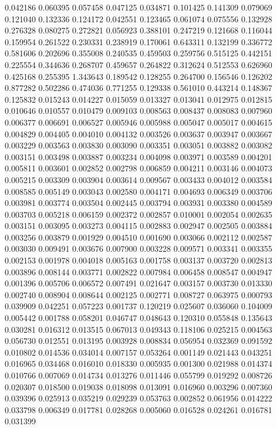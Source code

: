 0.042186
0.060395
0.057458
0.047125
0.034871
0.101425
0.141309
0.079069
0.121040
0.132336
0.124172
0.042551
0.123465
0.061074
0.075556
0.132928
0.276328
0.080275
0.272821
0.056923
0.388101
0.247219
0.121668
0.116044
0.159954
0.261522
0.230331
0.238919
0.170061
0.643311
0.132199
0.336772
0.581606
0.202696
0.355008
0.240535
0.459503
0.259756
0.515125
0.442151
0.225554
0.344636
0.268707
0.459657
0.264822
0.312624
0.512553
0.626960
0.425168
0.255395
1.343643
0.189542
0.128255
0.264700
0.156546
0.126202
0.877282
0.502286
0.474036
0.771255
0.129338
0.561010
0.443214
0.148367
0.125832
0.015243
0.014227
0.015059
0.013327
0.013041
0.012975
0.012815
0.010646
0.010557
0.010479
0.009103
0.008563
0.008437
0.008083
0.007960
0.006377
0.006691
0.006527
0.005946
0.005988
0.005047
0.005017
0.004615
0.004829
0.004405
0.004010
0.004132
0.003526
0.003637
0.003947
0.003667
0.003229
0.003563
0.003830
0.003090
0.003351
0.003051
0.003882
0.003082
0.003151
0.003498
0.003887
0.003234
0.004098
0.003971
0.003589
0.004201
0.005811
0.003601
0.002852
0.002798
0.006859
0.004211
0.003146
0.004073
0.005215
0.003309
0.003904
0.003614
0.009567
0.003433
0.004012
0.003584
0.008585
0.005149
0.003043
0.002580
0.004171
0.004693
0.006349
0.003706
0.003981
0.003774
0.003504
0.002445
0.003794
0.003931
0.003380
0.004589
0.003703
0.005218
0.006159
0.002372
0.002857
0.010001
0.002054
0.002635
0.003151
0.003095
0.003273
0.004115
0.002883
0.002947
0.002505
0.003884
0.003256
0.003879
0.001929
0.004510
0.001690
0.003066
0.002112
0.002587
0.003030
0.009491
0.003676
0.007900
0.003228
0.009571
0.003341
0.003355
0.002153
0.001978
0.004018
0.005163
0.001758
0.003137
0.003720
0.002813
0.003896
0.008144
0.003771
0.002822
0.007984
0.006458
0.008547
0.004947
0.001396
0.005706
0.006572
0.007491
0.021647
0.003157
0.003730
0.013330
0.002740
0.008904
0.008644
0.002125
0.002771
0.008727
0.063975
0.000793
0.039909
0.042251
0.057223
0.001737
0.120219
0.025607
0.036060
0.104009
0.005442
0.001788
0.058201
0.046747
0.048643
0.120310
0.055848
0.135643
0.030281
0.016312
0.013515
0.067013
0.049343
0.118106
0.025215
0.004563
0.056730
0.012551
0.013195
0.003928
0.008834
0.056954
0.032369
0.091592
0.010802
0.014536
0.034014
0.007157
0.053264
0.001149
0.021443
0.043251
0.016965
0.034468
0.016010
0.018330
0.005935
0.001300
0.021988
0.014374
0.010766
0.007069
0.014734
0.013276
0.011446
0.055799
0.019292
0.008726
0.020307
0.018500
0.019038
0.018098
0.013091
0.016960
0.003296
0.007360
0.039396
0.025913
0.035219
0.029239
0.053763
0.002852
0.061956
0.014222
0.033798
0.006349
0.017781
0.028268
0.005060
0.016528
0.024261
0.016781
0.031399
